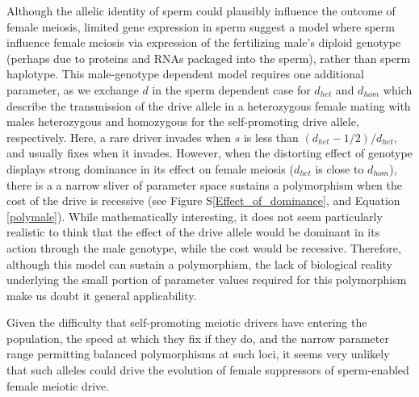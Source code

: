 \documentclass[12pt,letterpaper]{article}
\newcommand{\yb}[1]{{ \color{blue} #1}}
\begin{document}
Although the allelic identity of sperm could plausibly influence the outcome of female meiosis, 
	limited gene expression in sperm \citep[e.g.][]{Joseph2004}
	suggest a model where sperm influence female meiosis via expression of the fertilizing male's
	diploid genotype (perhaps due to proteins and RNAs packaged into the sperm), rather than sperm haplotype.
This male-genotype dependent model requires one additional parameter, as we exchange $d$ in the sperm dependent case for $d_{het}$ and $d_{hom}$ which describe the transmission of the drive allele in a heterozygous female mating with males heterozygous and homozygous for the self-promoting drive allele, respectively.  
Here, a rare driver invades when $s$ is less than $(d_{het}-1/2)/d_{het}$, and usually fixes when it invades.
However, when the distorting effect of genotype displays strong dominance in its
	effect on female meiosis ($d_{het}$ is close to $d_{hom}$), 
	there is a a narrow sliver of parameter space sustains a polymorphism
	when the cost of the drive is recessive
	(see Figure S\ref{Effect_of_dominance}, \yb{and Equation \ref{polymale}}).  
While mathematically interesting, it does not seem particularly realistic to think that the
	effect of the drive allele would be dominant in its action through the
	male genotype, while the cost would be recessive. 
Therefore, although this model can sustain a polymorphism, 
	the lack of biological reality underlying the small portion of parameter values 
	required for this polymorphism make us doubt it general applicability. 


Given the difficulty that self-promoting meiotic drivers have entering the population, the speed at
which they fix if they do, and the narrow parameter range permitting balanced polymorphisms at such loci,  
it seems very unlikely that such alleles could drive the evolution of female suppressors of sperm-enabled
female meiotic drive.
\end{document}
